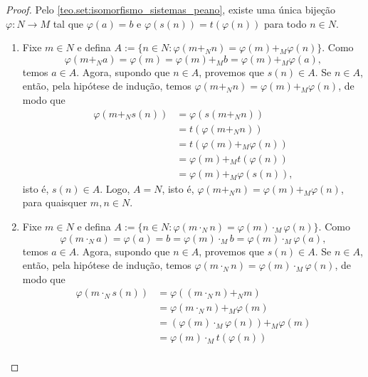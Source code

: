 \begin{proof}
    Pelo \cref{teo.set:isomorfismo_sistemas_peano}, existe uma única bijeção $\varphi : N \to M$ tal que $\varphi(a) = b$ e $\varphi(s(n)) = t(\varphi(n))$ para todo $n \in N$.
        \begin{enumerate}[label=\roman*.]
            \item Fixe $m \in N$ e defina
                $
                    A := \{n \in N : \varphi(m +_N n) = \varphi(m) +_M \varphi(n)\}.
                $
            Como
                \[
                    \varphi(m +_N a) = \varphi(m) = \varphi(m) +_M b = \varphi(m) +_M \varphi(a),
                \]
            temos $a \in A$. Agora, supondo que $n \in A$, provemos que $s(n) \in A$. Se $n \in A$, então, pela hipótese de indução, temos $\varphi(m +_N n) = \varphi(m) +_M \varphi(n)$, de modo que
                \begin{align*}
                    \varphi(m +_N s(n)) &= \varphi(s(m +_N n)) \\
                    &= t(\varphi(m +_N n)) \\
                    &= t(\varphi(m) +_M \varphi(n)) \\
                    &= \varphi(m) +_M t(\varphi(n)) \\
                    &= \varphi(m) +_M \varphi(s(n)),
                \end{align*}
            isto é, $s(n) \in A$. Logo, $A = N$, isto é, $\varphi(m +_N n) = \varphi(m) +_M \varphi(n)$, para quaisquer $m, n \in N$.
            \item Fixe $m \in N$ e defina $A := \{n \in N : \varphi(m \cdot_N n) = \varphi(m) \cdot_M \varphi(n)\}$. Como
                \[
                    \varphi(m \cdot_N a) = \varphi(a) = b = \varphi(m) \cdot_M b = \varphi(m) \cdot_M \varphi(a),
                \]
            temos $a \in A$. Agora, supondo que $n \in A$, provemos que $s(n) \in A$. Se $n \in A$, então, pela hipótese de indução, temos $\varphi(m \cdot_N n) = \varphi(m) \cdot_M \varphi(n)$, de modo que
                \begin{align*}
                    \varphi(m \cdot_N s(n)) &= \varphi((m \cdot_N n) +_N m) \\
                    &= \varphi(m \cdot_N n) +_M \varphi(m) \\
                    &= (\varphi(m) \cdot_M \varphi(n)) +_M \varphi(m) \\
                    &= \varphi(m) \cdot_M t(\varphi(n)) \\

\end{align*}
\end{enumerate}
\end{proof}

